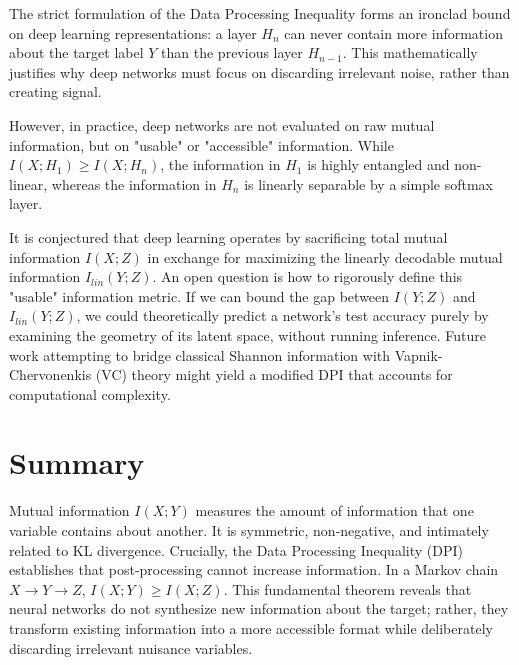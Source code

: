 \begin{horizon}
The strict formulation of the Data Processing Inequality forms an ironclad bound on deep learning representations: a layer $H_n$ can never contain more information about the target label $Y$ than the previous layer $H_{n-1}$. This mathematically justifies why deep networks must focus on discarding irrelevant noise, rather than creating signal.

However, in practice, deep networks are not evaluated on raw mutual information, but on "usable" or "accessible" information. While $I(X;H_1) \geq I(X;H_n)$, the information in $H_1$ is highly entangled and non-linear, whereas the information in $H_n$ is linearly separable by a simple softmax layer. 

It is conjectured that deep learning operates by sacrificing total mutual information $I(X;Z)$ in exchange for maximizing the linearly decodable mutual information $I_{lin}(Y;Z)$. An open question is how to rigorously define this "usable" information metric. If we can bound the gap between $I(Y;Z)$ and $I_{lin}(Y;Z)$, we could theoretically predict a network's test accuracy purely by examining the geometry of its latent space, without running inference. Future work attempting to bridge classical Shannon information with Vapnik-Chervonenkis (VC) theory might yield a modified DPI that accounts for computational complexity.
\end{horizon}

\section*{Summary}
Mutual information $I(X;Y)$ measures the amount of information that one variable contains about another. It is symmetric, non-negative, and intimately related to KL divergence. Crucially, the Data Processing Inequality (DPI) establishes that post-processing cannot increase information. In a Markov chain $X \to Y \to Z$, $I(X;Y) \geq I(X;Z)$. This fundamental theorem reveals that neural networks do not synthesize new information about the target; rather, they transform existing information into a more accessible format while deliberately discarding irrelevant nuisance variables.

